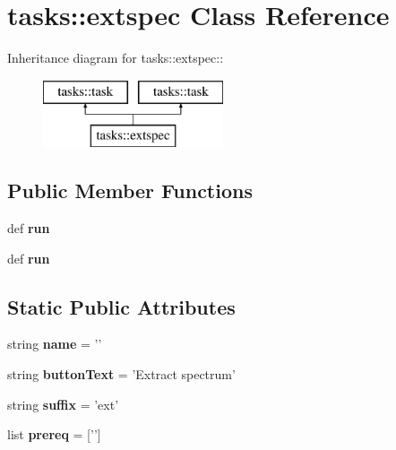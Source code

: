 \section{tasks::extspec Class Reference}
\label{classtasks_1_1extspec}
Inheritance diagram for tasks::extspec::\begin{figure}[H]
\begin{center}
\leavevmode
\includegraphics[height=2cm]{classtasks_1_1extspec}
\end{center}
\end{figure}
\subsection*{Public Member Functions}
\begin{CompactItemize}
\item 
def \textbf{run}\label{classtasks_1_1extspec_d8747d2d2a84687ac308a34499722371}

\item 
def \textbf{run}\label{classtasks_1_1extspec_d8747d2d2a84687ac308a34499722371}

\end{CompactItemize}
\subsection*{Static Public Attributes}
\begin{CompactItemize}
\item 
string \textbf{name} = '{\bfextspec}'\label{classtasks_1_1extspec_57fc78626df427deb4502e071327663f}

\item 
string \textbf{button\-Text} = 'Extract spectrum'\label{classtasks_1_1extspec_a9815400ea11a7ec15cca5a8bbb23da8}

\item 
string \textbf{suffix} = 'ext'\label{classtasks_1_1extspec_6c2d64ca5c93c30b4cd3c7baa2553f72}

\item 
list \textbf{prereq} = ['{\bfpreproc}']\label{classtasks_1_1extspec_030089666ca0a88ed448ed47b725760f}

\end{CompactItemize}


